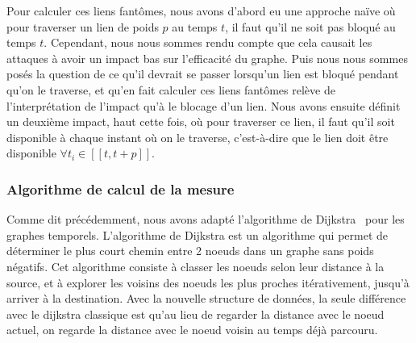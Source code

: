 Pour calculer ces liens fantômes, nous avons d'abord eu une approche naïve où pour traverser un lien de poids $p$ au temps $t$, il faut qu'il ne soit pas bloqué au temps $t$.
Cependant, nous nous sommes rendu compte que cela causait les attaques à avoir un impact bas sur l'efficacité du graphe.
Puis nous nous sommes posés la question de ce qu'il devrait se passer lorsqu'un lien est bloqué pendant qu'on le traverse, et qu'en fait calculer ces liens fantômes relève de l'interprétation de l'impact qu'à le blocage d'un lien.
Nous avons ensuite définit un deuxième impact, haut cette fois, où pour traverser ce lien, il faut qu'il soit disponible à chaque instant où on le traverse, c'est-à-dire que le lien doit être disponible $\forall t_{i} \in [\![t,t + p]\!]$.
\label{impact_haut_bas}
\begin{figure}[H]
    \begin{minipage}{\textwidth}
        \centering
    \end{minipage}

    \vspace{1cm} %

    \begin{minipage}{\textwidth}
        \centering
    \end{minipage}

    \vspace{1cm} %

    \begin{minipage}{\textwidth}
        \centering
    \end{minipage}
\end{figure}

\subsubsection{Algorithme de calcul de la mesure}

Comme dit précédemment, nous avons adapté l'algorithme de Dijkstra~\cite{dijkstra} pour les graphes temporels.
L'algorithme de Dijkstra est un algorithme qui permet de déterminer le plus court chemin entre 2 noeuds dans un graphe sans poids négatifs.
Cet algorithme consiste à classer les noeuds selon leur distance à la source, et à explorer les voisins des noeuds les plus proches itérativement, jusqu'à arriver à la destination.
Avec la nouvelle structure de données, la seule différence avec le dijkstra classique est qu'au lieu de regarder la distance avec le noeud actuel, on regarde la distance avec le noeud voisin au temps déjà parcouru.

